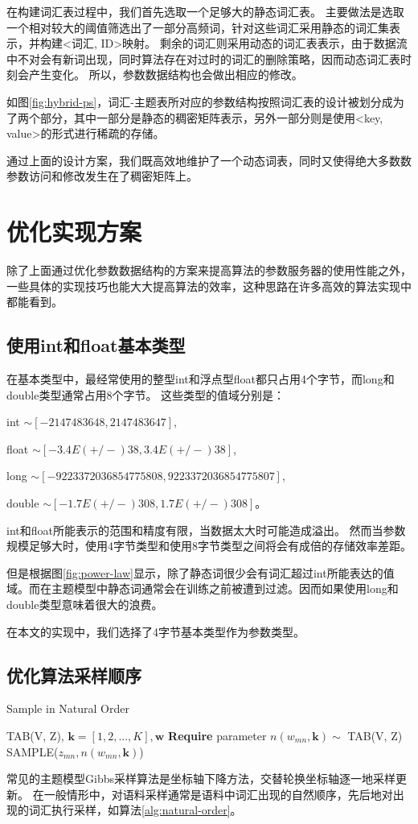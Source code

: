 在构建词汇表过程中，我们首先选取一个足够大的静态词汇表。
主要做法是选取一个相对较大的阈值筛选出了一部分高频词，针对这些词汇采用静态的词汇集表示，并构建<词汇, ID>映射。
剩余的词汇则采用动态的词汇表表示，由于数据流中不对会有新词出现，同时算法存在对过时的词汇的删除策略，因而动态词汇表时刻会产生变化。
所以，参数数据结构也会做出相应的修改。

如图\ref{fig:hybrid-ps}，词汇-主题表所对应的参数结构按照词汇表的设计被划分成为了两个部分，其中一部分是静态的稠密矩阵表示，另外一部分则是使用<key, value>的形式进行稀疏的存储。

通过上面的设计方案，我们既高效地维护了一个动态词表，同时又使得绝大多数数参数访问和修改发生在了稠密矩阵上。

\section{优化实现方案}
除了上面通过优化参数数据结构的方案来提高算法的参数服务器的使用性能之外，
一些具体的实现技巧也能大大提高算法的效率，这种思路在许多高效的算法实现中都能看到。

\subsection{使用int和float基本类型}
在基本类型中，最经常使用的整型int和浮点型float都只占用4个字节，而long和double类型通常占用8个字节。
这些类型的值域分别是：

int $\sim [-2147483648, 2147483647]$,

float $\sim [-3.4E(+/-)38, 3.4E(+/-)38]$, 

long $\sim [-9223372036854775808, 9223372036854775807]$,
	 
double $\sim [-1.7E(+/-)308, 1.7E(+/-)308]$。

int和float所能表示的范围和精度有限，当数据太大时可能造成溢出。
然而当参数规模足够大时，使用4字节类型和使用8字节类型之间将会有成倍的存储效率差距。

但是根据图\ref{fig:power-law}显示，除了静态词很少会有词汇超过int所能表达的值域。而在主题模型中静态词通常会在训练之前被遭到过滤。因而如果使用long和double类型意味着很大的浪费。

在本文的实现中，我们选择了4字节基本类型作为参数类型。

\subsection{优化算法采样顺序}

\begin{algorithm}[htb]
\label{alg:natural-order}
\caption{Sample in Natural Order}
\begin{algorithmic}[1] 
\Require TAB(V, Z), $\mathbf{k} = [1, 2, ..., K], \mathbf{w}$
\State \textbf{Require} parameter $n(w_{mn}, \mathbf{k}) \sim$ TAB(V, Z)
\State SAMPLE($z_{mn}, n(w_{mn}, \mathbf{k})$)
\EndFor
\EndFor
\end{algorithmic}  
\end{algorithm}  
常见的主题模型Gibbs采样算法是坐标轴下降方法，交替轮换坐标轴逐一地采样更新。
在一般情形中，对语料采样通常是语料中词汇出现的自然顺序，先后地对出现的词汇执行采样，如算法\ref{alg:natural-order}。

